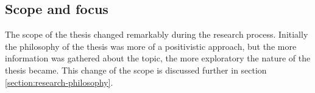 \documentclass[english, 12pt, a4paper, sci, utf8, a-1b, online]{aaltothesis}
\begin{document}




\subsection{Scope and focus}

The scope of the thesis changed remarkably during the research process. Initially the philosophy of the thesis was more of a positivistic approach, but the more information was gathered about the topic, the more exploratory the nature of the thesis became. This change of the scope is discussed further in section \ref{section:research-philosophy}.
\end{document}
